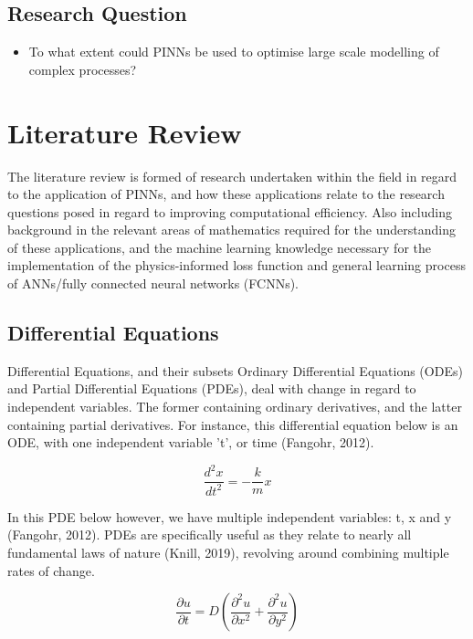\documentclass[12pt, openany]{book}
\begin{document}
\section{Research Question}

\begin{itemize}
    \item To what extent could PINNs be used to optimise large scale modelling of complex processes? 
\end{itemize}

\newpage


\chapter{Literature Review}

The literature review is formed of research undertaken within the field in regard to the application of PINNs, and how these applications relate to the research questions posed in regard to improving computational efficiency. Also including background in the relevant areas of mathematics required for the understanding of these applications, and the machine learning knowledge necessary for the implementation of the physics-informed loss function and general learning process of ANNs/fully connected neural networks (FCNNs).

\section{Differential Equations}

Differential Equations, and their subsets Ordinary Differential Equations (ODEs) and Partial Differential Equations (PDEs), deal with change in regard to independent variables. The former containing ordinary derivatives, and the latter containing partial derivatives. For instance, this differential equation below is an ODE, with one independent variable 't', or time (Fangohr, 2012).

\[\frac{d^2x}{dt^2}=-\frac{k}{m}x\]

In this PDE below however, we have multiple independent variables: t, x and y (Fangohr, 2012). PDEs are specifically useful as they relate to nearly all fundamental laws of nature (Knill, 2019), revolving around combining multiple rates of change.

\[\frac{\partial u}{\partial t}=D(\frac{\partial ^2u}{\partial x^2} +\frac{\partial ^2u}{\partial y^2})\]
\end{document}
